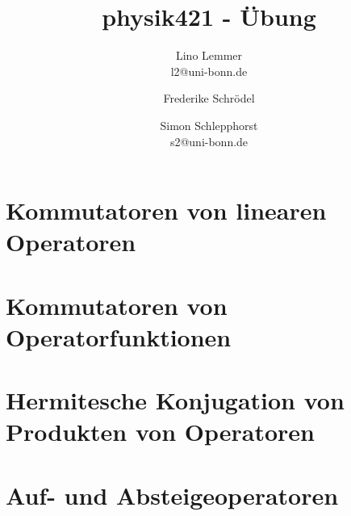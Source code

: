 

\setcounter{thezettel}{6}
\renewcommand\thesection{\arabic{thezettel}.\arabic{section}}


\title{physik421 - Übung }
\author{Lino Lemmer \\ \small{l2@uni-bonn.de} \and Frederike Schrödel \and Simon Schlepphorst\\ \small{s2@uni-bonn.de}}


\maketitle

\section{Kommutatoren von linearen Operatoren}

\section{Kommutatoren von Operatorfunktionen}

\section{Hermitesche Konjugation von Produkten von Operatoren}

\section{Auf- und Absteigeoperatoren}


